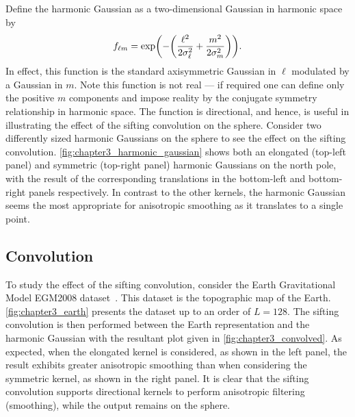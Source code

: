 Define the harmonic Gaussian as a two-dimensional Gaussian in harmonic space by
%
\begin{equation}\label{eq:chapter3_harmonic_gaussian}
	{f}_{\ell m}
	= \exp(-\bigg(\frac{{\ell}^{2}}{2\sigma_{\ell}^{2}} + \frac{{m}^{2}}{2\sigma_{m}^{2}}\bigg)).
\end{equation}
%
In effect, this function is the standard axisymmetric Gaussian in \(\ell{}\) modulated by a Gaussian in \(m\).
Note this function is not real --- if required one can define only the positive \(m\) components and impose reality by the conjugate symmetry relationship in harmonic space.
The function is directional, and hence, is useful in illustrating the effect of the sifting convolution on the sphere.
Consider two differently sized harmonic Gaussians on the sphere to see the effect on the sifting convolution.
\cref{fig:chapter3_harmonic_gaussian} shows both an elongated (top-left panel) and symmetric (top-right panel) harmonic Gaussians on the north pole, with the result of the corresponding translations in the bottom-left and bottom-right panels respectively.
In contrast to the other kernels, the harmonic Gaussian seems the most appropriate for anisotropic smoothing as it translates to a single point.



\subsection{Convolution}\label{sec:chapter3_convolution}

To study the effect of the sifting convolution, consider the Earth Gravitational Model EGM2008 dataset~\cite{Pavlis2013}.
This dataset is the topographic map of the Earth.
\cref{fig:chapter3_earth} presents the dataset up to an order of \(L=128\).
The sifting convolution is then performed between the Earth representation and the harmonic Gaussian with the resultant plot given in \cref{fig:chapter3_convolved}.
As expected, when the elongated kernel is considered, as shown in the left panel, the result exhibits greater anisotropic smoothing than when considering the symmetric kernel, as shown in the right panel.
It is clear that the sifting convolution supports directional kernels to perform anisotropic filtering (smoothing), while the output remains on the sphere.





